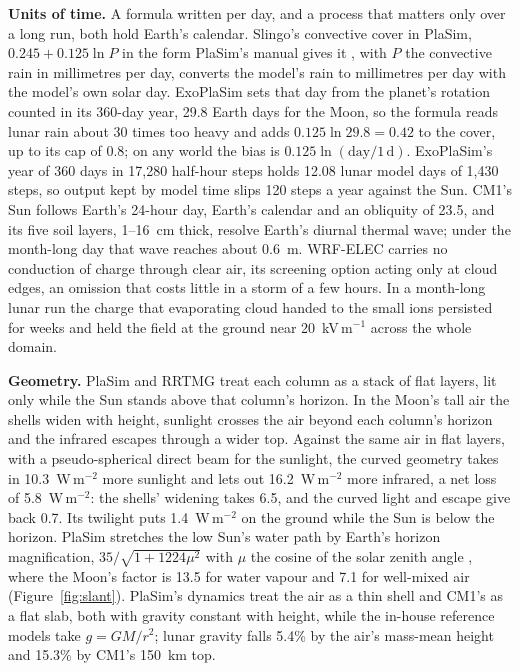 \textbf{Units of time.} A formula written per day, and a process that matters only over a long run, both
hold Earth's calendar. Slingo's convective cover in PlaSim, $0.245 + 0.125\ln P$ in the form PlaSim's
manual gives it \autocite{slingo1991response,lunkeit2012plasim}, with $P$ the convective rain in
millimetres per day, converts the model's rain to millimetres per day with the model's own solar day.
ExoPlaSim sets that day from the planet's rotation counted in its 360-day year, 29.8 Earth days for the
Moon, so the formula reads lunar rain about 30 times too heavy and adds $0.125\ln 29.8 = 0.42$ to the
cover, up to its cap of 0.8; on any world the bias is $0.125\ln(\text{day}/1\,\text{d})$.
ExoPlaSim's year of 360 days in 17,280 half-hour steps holds 12.08 lunar model days of 1,430 steps, so
output kept by model time slips 120 steps a year against the Sun. CM1's Sun follows Earth's
24-hour day, Earth's calendar and an obliquity of 23.5\textdegree, and its five soil layers, 1--16~cm
thick, resolve Earth's diurnal thermal wave; under the month-long day that wave reaches about
0.6~m. WRF-ELEC carries no conduction of charge through clear air, its screening option acting
only at cloud edges, an omission that costs little in a storm of a few hours. In a month-long lunar run the
charge that evaporating cloud handed to the small ions persisted for weeks and held the field at the ground
near 20~kV\,m$^{-1}$ across the whole domain.

\textbf{Geometry.} PlaSim and RRTMG treat each column as a stack of flat layers, lit only while the Sun
stands above that column's horizon. In the Moon's tall air the shells widen with height, sunlight crosses
the air beyond each column's horizon and the infrared escapes through a wider top. Against the same air in
flat layers, with a pseudo-spherical direct beam for the sunlight, the curved geometry takes in
10.3~W\,m$^{-2}$ more sunlight and lets out 16.2~W\,m$^{-2}$ more infrared, a net loss of
5.8~W\,m$^{-2}$: the shells' widening takes 6.5, and the curved light and escape give back 0.7. Its
twilight puts 1.4~W\,m$^{-2}$ on the ground while the Sun is below the horizon. PlaSim stretches
the low Sun's water path by Earth's horizon magnification, $35/\sqrt{1+1224\mu^2}$ with $\mu$ the cosine of
the solar zenith angle \autocite{lacis1974parameterization,rodgers1967use}, where the Moon's factor is 13.5
for water vapour and 7.1 for well-mixed air (Figure~\ref{fig:slant}). PlaSim's dynamics treat
the air as a thin shell and CM1's as a flat slab, both with gravity constant with height, while the
in-house reference models take $g = GM/r^2$; lunar gravity falls 5.4\% by the air's mass-mean height and
15.3\% by CM1's 150~km top.

